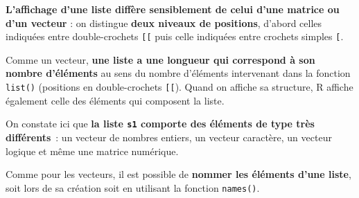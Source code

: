 \documentclass[12pt,twosided, notitlepage]{book}
\newenvironment{Shaded}{}{}
\newcommand{\KeywordTok}[1]{\textcolor[rgb]{0.00,0.00,1.00}{{#1}}}
\newcommand{\CommentTok}[1]{\textcolor[rgb]{0.00,0.50,0.00}{{#1}}}
\newcommand{\NormalTok}[1]{{#1}}
\renewenvironment{Shaded}{\begin{snugshade}}{\end{snugshade}}
\begin{document}
\textbf{L'affichage d'une liste diffère sensiblement de celui d'une
matrice ou d'un vecteur} : on distingue \textbf{deux niveaux de
positions}, d'abord celles indiquées entre double-crochets
\texttt{{[}{[}} puis celle indiquées entre crochets simples
\texttt{{[}}.

Comme un vecteur, \textbf{une liste a une longueur qui correspond à son
nombre d'éléments} au sens du nombre d'éléments intervenant dans la
fonction \texttt{list()} (positions en double-crochets \texttt{{[}{[}}).
Quand on affiche sa structure, R affiche également celle des éléments
qui composent la liste.

\begin{Shaded}
\end{Shaded}

On constate ici que \textbf{la liste \texttt{s1} comporte des éléments
de type très différents}~: un vecteur de nombres entiers, un vecteur
caractère, un vecteur logique et même une matrice numérique.

Comme pour les vecteurs, il est possible de \textbf{nommer les éléments
d'une liste}, soit lors de sa création soit en utilisant la fonction
\texttt{names()}.
\end{document}
